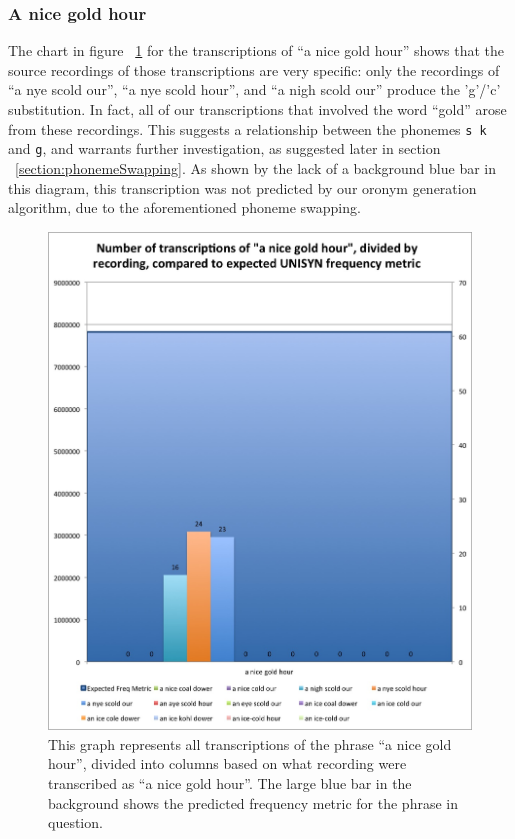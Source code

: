 \subsubsection{A nice gold hour}
\label{results:transcriptionCountPerRecording:a_nice_gold_hour}

The chart in figure ~\ref{fig:results:transcriptionCountPerRecordingANiceGoldHour} for the transcriptions of ``a nice gold hour'' shows that the source recordings of those transcriptions are very specific: only the recordings of ``a nye scold our'', ``a nye scold hour'', and ``a nigh scold our'' produce the 'g'/'c' substitution. In fact, all of our transcriptions that involved the word ``gold'' arose from these recordings. This suggests a relationship between the phonemes \texttt{s k} and \texttt{g}, and warrants further investigation, as suggested later in section ~\ref{section:phonemeSwapping}. As shown by the lack of a background blue bar in this diagram, this transcription was not predicted by our oronym generation algorithm, due to the aforementioned phoneme swapping.

\begin{figure}
\includegraphics[width=\textwidth]{TranscriptionCountPerRecording_aNiceGoldHour.jpg}
\captionfonts
\caption[Transcription Count Per Recording for the transcribed phrase ``a nice gold hour'']{ This graph represents all transcriptions of the phrase ``a nice gold hour'', divided into columns based on what recording were transcribed as ``a nice gold hour''. The large blue bar in the background shows the predicted frequency metric for the phrase in question.}
\label{fig:results:transcriptionCountPerRecordingANiceGoldHour}
\end{figure}



